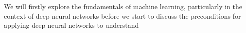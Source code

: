 We will firstly explore the fundamentals of machine learning, particularly in the context of deep neural networks before we start to discuss the preconditions for applying deep neural networks to understand 